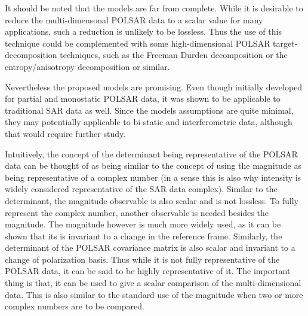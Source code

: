 \documentclass[journal,12pt,draftcls,onecolumn]{IEEEtran}
\begin{document}
It should be noted that the models are far from complete.
While it is desirable to reduce the multi-dimensonal POLSAR data to a scalar value for many applications,
  such a reduction is unlikely to be lossless.  
Thus %
the use of this technique could be complemented with some high-dimensional POLSAR target-decomposition techniques, such as the Freeman Durden decomposition \cite{Freeman_1998_TGRS_963} or the entropy/anisotropy decomposition \cite{Cloude_1997_TGRS_68} or similar.

Nevertheless the proposed models are promising.
Even though initially developed for partial and monostatic POLSAR data,
  it was shown to be applicable to traditional SAR data as well.
Since the models assumptions are quite minimal, they may potentially applicable to bi-static and interferometric data, although that would require further study.

Intuitively, the concept of the determinant being representative of the POLSAR data can be thought of as being similar to the concept of using the magnitude as being representative of a complex number
(in a sense this is also why intensity is widely considered representative of the SAR data complex).
Similar to the determinant, the magnitude observable is also scalar and is not lossless.
To fully represent the complex number, another observable is needed besides the magnitude.
The magnitude however is much more widely used, as it can be shown that its is invariant to a change in the reference frame.
Similarly, the determinant of the POLSAR covariance matrix is also scalar and invariant to a change of polarization basis.
Thus while it is not fully representative of the POLSAR data, it can be said to be highly representative of it.
The important thing is that, it can be used to give a scalar comparison of the multi-dimensional data.
This is also similar to the standard use of the magnitude when two or more complex numbers are to be compared. %
\end{document}
